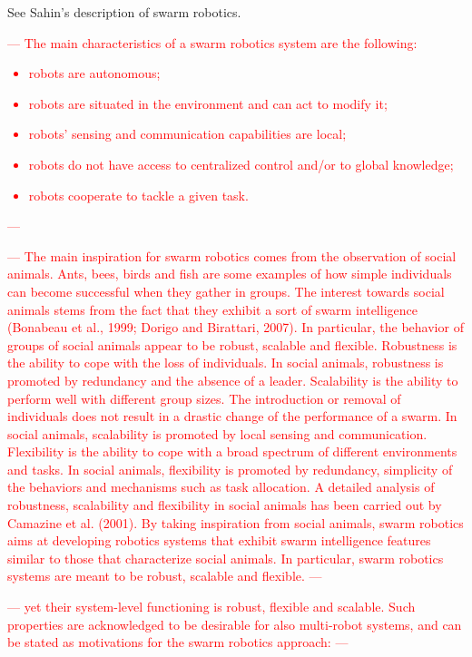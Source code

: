 See Sahin's \cite{csahin2004swarm} description of swarm robotics.
\textcolor{red}{---
The main characteristics of a swarm robotics system are the following:
\begin{itemize}
    \item robots are autonomous;
    \item robots are situated in the environment and can act to modify it;
    \item robots’ sensing and communication capabilities are local;
    \item robots do not have access to centralized control and/or to global knowledge;
    \item robots cooperate to tackle a given task.
\end{itemize}
---}

\textcolor{red}{---
The main inspiration for swarm robotics comes from the observation of social animals. 
Ants, bees, birds and fish are some examples of how simple individuals can become successful when they gather in groups. 
The interest towards social animals stems from the fact that they exhibit a sort of swarm intelligence (Bonabeau et al., 1999; Dorigo and Birattari, 2007). 
In particular, the behavior of groups of social animals appear to be robust, scalable and flexible.
Robustness is the ability to cope with the loss of individuals. 
In social animals, robustness is promoted by redundancy and the absence of a leader. 
Scalability is the ability to perform well with different group sizes. 
The introduction or removal of individuals does not result in a drastic change of the performance of a swarm. 
In social animals, scalability is promoted by local sensing and communication. 
Flexibility is the ability to cope with a broad spectrum of different environments and tasks. 
In social animals, flexibility is promoted by redundancy, simplicity of the behaviors and mechanisms such as task allocation. 
A detailed analysis of robustness, scalability and flexibility in social animals has been carried out by Camazine et al. (2001).
By taking inspiration from social animals, 
swarm robotics aims at developing robotics systems that exhibit swarm intelligence features similar to those that characterize social animals. 
In particular, swarm robotics systems are meant to be robust, scalable and flexible.
---}

\textcolor{red}{---
yet their system-level functioning is robust, flexible and scalable. 
Such properties are acknowledged to be desirable for also multi-robot systems, 
and can be stated as motivations for the swarm robotics approach:
---}

